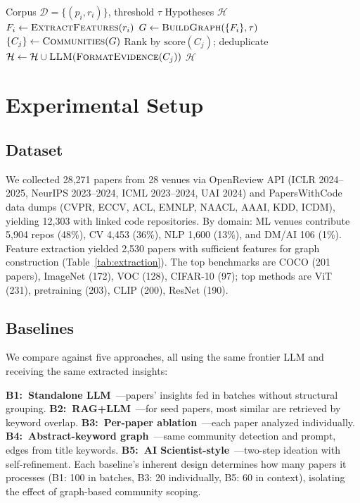 \documentclass[conference]{IEEEtran}
\begin{document}
\begin{algorithm}[t]
\caption{Cross-Paper Hypothesis Generation}
\label{alg:pipeline}
\begin{algorithmic}[1]
\REQUIRE Corpus $\mathcal{D} = \{(p_i, r_i)\}$, threshold $\tau$
\ENSURE Hypotheses $\mathcal{H}$
    \STATE $F_i \leftarrow \textsc{ExtractFeatures}(r_i)$
\ENDFOR
\STATE $G \leftarrow \textsc{BuildGraph}(\{F_i\}, \tau)$ \hfill{}
\STATE $\{C_j\} \leftarrow \textsc{Communities}(G)$ \hfill{}
\STATE Rank by $\text{score}(C_j)$; deduplicate
    \STATE $\mathcal{H} \leftarrow \mathcal{H} \cup \textsc{LLM}(\textsc{FormatEvidence}(C_j))$
\ENDFOR
\RETURN $\mathcal{H}$
\end{algorithmic}
\end{algorithm}


\section{Experimental Setup}

\subsection{Dataset}

We collected 28{,}271 papers from 28 venues via OpenReview API (ICLR 2024--2025, NeurIPS 2023--2024, ICML 2023--2024, UAI 2024) and PapersWithCode data dumps (CVPR, ECCV, ACL, EMNLP, NAACL, AAAI, KDD, ICDM), yielding 12{,}303 with linked code repositories.
By domain: ML venues contribute 5{,}904 repos (48\%), CV 4{,}453 (36\%), NLP 1{,}600 (13\%), and DM/AI 106 (1\%).
Feature extraction yielded 2{,}530 papers with sufficient features for graph construction (Table~\ref{tab:extraction}).
The top benchmarks are COCO (201 papers), ImageNet (172), VOC (128), CIFAR-10 (97); top methods are ViT (231), pretraining (203), CLIP (200), ResNet (190).


\subsection{Baselines}

We compare against five approaches, all using the same frontier LLM and receiving the same extracted insights:

\textbf{B1:~Standalone LLM}~\cite{si2024llmideas}---papers' insights fed in batches without structural grouping.
\textbf{B2:~RAG+LLM}~\cite{radensky2025scideator}---for seed papers, most similar are retrieved by keyword overlap.
\textbf{B3:~Per-paper ablation}~\cite{abramovich2025ablationbench}---each paper analyzed individually.
\textbf{B4:~Abstract-keyword graph}~\cite{xiong2024kgcoi}---same community detection and prompt, edges from title keywords.
\textbf{B5:~AI Scientist-style}~\cite{lu2024aiscientist}---two-step ideation with self-refinement.
Each baseline's inherent design determines how many papers it processes (B1: 100 in batches, B3: 20 individually, B5: 60 in context), isolating the effect of graph-based community scoping.
\end{document}
